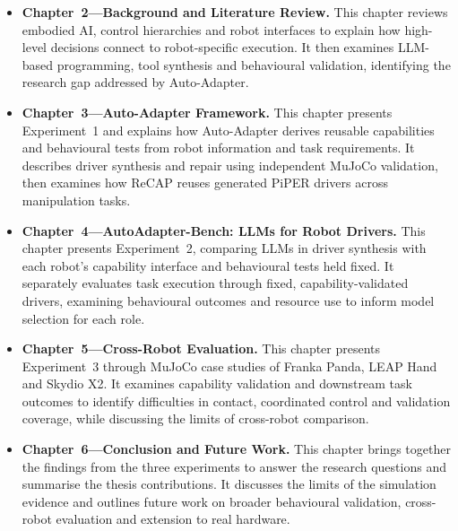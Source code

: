 \begin{itemize}[leftmargin=*,itemsep=0.7em]

  \item \textbf{Chapter~2---Background and Literature Review.}
  This chapter reviews embodied AI, control hierarchies and robot interfaces
  to explain how high-level decisions connect to robot-specific execution.
  It then examines LLM-based programming, tool synthesis and behavioural
  validation, identifying the research gap addressed by Auto-Adapter.

  \item \textbf{Chapter~3---Auto-Adapter Framework.}
  This chapter presents Experiment~1 and explains how Auto-Adapter derives
  reusable capabilities and behavioural tests from robot information and
  task requirements.
  It describes driver synthesis and repair using independent MuJoCo
  validation, then examines how ReCAP reuses generated PiPER drivers
  across manipulation tasks.

  \item \textbf{Chapter~4---AutoAdapter-Bench: LLMs for Robot Drivers.}
  This chapter presents Experiment~2, comparing LLMs in driver synthesis
  with each robot's capability interface and behavioural tests held fixed.
  It separately evaluates task execution through fixed, capability-validated
  drivers, examining behavioural outcomes and resource use to inform
  model selection for each role.

  \item \textbf{Chapter~5---Cross-Robot Evaluation.}
  This chapter presents Experiment~3 through MuJoCo case studies of
  Franka Panda, LEAP Hand and Skydio X2.
  It examines capability validation and downstream task outcomes to
  identify difficulties in contact, coordinated control and validation
  coverage, while discussing the limits of cross-robot comparison.

  \item \textbf{Chapter~6---Conclusion and Future Work.}
  This chapter brings together the findings from the three experiments
  to answer the research questions and summarise the thesis contributions.
  It discusses the limits of the simulation evidence and outlines
  future work on broader behavioural validation, cross-robot evaluation
  and extension to real hardware.

\end{itemize}

